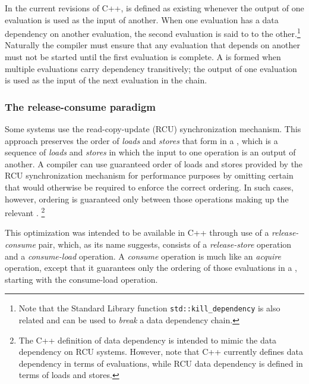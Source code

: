 In the current revisions of C++,  is defined as
existing whenever the output of one evaluation is used as the input of
another. When one evaluation has a data dependency on another
evaluation, the second evaluation is said to 
to the other.{\cprotect\footnote{Note that the Standard Library function
\lstinline!std::kill_dependency! is also related and can be used to
  \emph{break} a data dependency chain.}} Naturally the compiler must
ensure that any evaluation that depends on another must not be started
until the first evaluation is complete. A 
is formed when multiple evaluations carry dependency transitively; the
output of one evaluation is used as the input of the next evaluation in
the chain.

\subsubsection[The release-consume paradigm]{The release-consume paradigm}\label{the-release-consume-paradigm}

Some systems use the read-copy-update (RCU) synchronization mechanism.
This approach preserves the order of \emph{loads} and \emph{stores} that
form in a , which is a sequence of
\emph{loads} and \emph{stores} in which the input to one operation is an
output of another. A compiler can use guaranteed order of loads
and stores provided by the RCU synchronization mechanism for performance purposes by omitting certain
 that would otherwise be required to
enforce the correct ordering. In such cases, however, ordering is
guaranteed only between those operations making up the relevant
. {\cprotect\footnote{The C++ definition
of data dependency is intended to mimic the data dependency on RCU
systems. However, note that C++ currently defines data dependency in
terms of evaluations, while RCU data dependency is defined in terms of
  loads and stores.}}

This optimization was intended to be available in C++ through use of a
\emph{release-consume} pair, which, as its name
suggests, consists of a \emph{release-store} operation and a
\emph{consume-load} operation. A \emph{consume} operation is much like
an \emph{acquire} operation, except that it guarantees only the ordering
of those evaluations in a , starting with
the consume-load operation.

